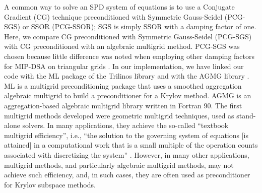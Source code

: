 \documentclass[preprint,10pt]{elsarticle}
\renewcommand{\(}{\left(}
\renewcommand{\)}{\right)}
\renewcommand{\[}{\left[}
\renewcommand{\]}{\right]}
\begin{document}
A common way to solve an SPD system of equations is to use a 
Conjugate Gradient (CG) technique preconditioned  with Symmetric Gauss-Seidel (PCG-SGS)
or SSOR (PCG-SSOR); SGS is simply SSOR with a damping factor of one. Here, we
compare CG preconditioned with Symmetric Gauss-Seidel (PCG-SGS) with CG preconditioned with an
algebraic multigrid method. PCG-SGS was chosen because little difference was noted 
when employing other damping factors for MIP-DSA on triangular grids \cite{wang_personal_comm}. 
In our implementation, we have linked our code with the ML package 
\cite{ml_guide} of the Trilinos library and with the AGMG library \cite{agmg_guide}. 
ML is a multigrid preconditioning package that uses a smoothed aggregation 
algebraic multigrid to build a preconditioner for a Krylov method. AGMG is an 
aggregation-based algebraic multigrid library written in Fortran 90.
%
The first multigrid methods developed were geometric multigrid techniques, used as 
stand-alone solvers. In many applications, they achieve the so-called 
``textbook multigrid efficiency'', i.e., ``the solution to the governing 
system of equations [is attained] in a computational work that is a small 
multiple of the operation counts associated with discretizing the system'' 
\cite{textbook_eff}. However, in many other applications, multigrid methods, 
and particularly algebraic multigrid methods, may not achieve such efficiency, 
\cite{k_cycle} and, in such cases, they are often used as preconditioner for 
Krylov subspace methods. 
\end{document}
